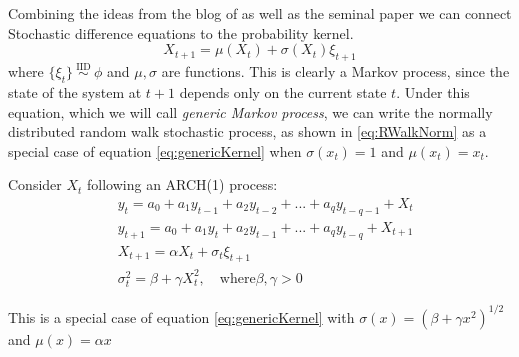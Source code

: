 \documentclass[a4paper,12pt]{article}
\theoremstyle{definition}
\begin{document}
Combining the ideas from the blog of \cite{quantecon} as well as the seminal paper \cite{Tauchen86} we can connect Stochastic difference equations to the probability kernel.
\begin{equation}\label{eq:genericKernel}
X_{t+1} = \mu(X_t) +\sigma(X_t)\xi_{t+1}
\end{equation}
where $\{ \xi_t \} \stackrel {\textrm{ IID }} {\sim} \phi$ and $\mu, \sigma$ are functions.
This is clearly a Markov process, since the state of the system at $t+1$ depends only on the current state $t$. 
Under this equation, which we will call \emph{generic Markov process}, we can write the normally distributed random walk stochastic process, as shown in \ref{eq:RWalkNorm} as a special case of equation \ref{eq:genericKernel} when $\sigma(x_t)=1$ and $\mu(x_t)=x_t$.

Consider  $X_t$ following an ARCH(1) process:
\begin{align*}
& y_{t}   = a_0 + a_1y_{t-1}+ a_2y_{t-2}+...+a_qy_{t-q-1} + X_t \\
& y_{t+1} = a_0 + a_1y_{t}+ a_2y_{t-1}+...+a_qy_{t-q} + X_{t+1} \\
& X_{t+1} = \alpha X_{t} + \sigma_t \xi_{t+1} \\
& \sigma_t^2 = \beta + \gamma X_t^2, \quad \text{where} \beta, \gamma >0
\end{align*}

This is a special case of equation \ref{eq:genericKernel} with $\sigma(x) = (\beta + \gamma x^2)^{1/2}$ and $\mu(x) = \alpha x$
\end{document}
